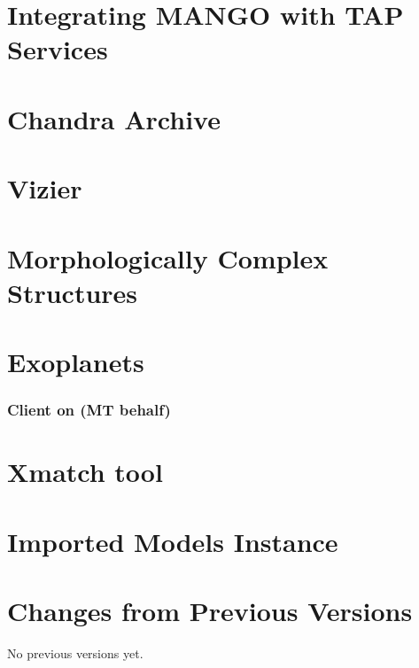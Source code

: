 \documentclass[11pt,a4paper]{ivoa}
\begin{document}



\section{Integrating MANGO with TAP Services}


\pagebreak
\appendix

% 

% 

\section{Chandra Archive}
\label{sec:chandra} 


\section{Vizier}


\section{Morphologically Complex Structures}


\section{Exoplanets}


\subsubsection{Client on (MT behalf)}


\section{Xmatch tool }


\section{Imported Models Instance}

\section{Changes from Previous Versions}

No previous versions yet.



\end{document}
